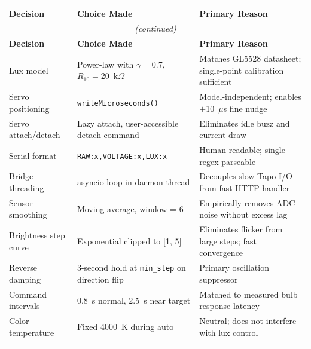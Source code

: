 \documentclass[12pt,letterpaper]{article}
\begin{document}
\begin{longtable}{p{3.5cm}p{5.5cm}p{5cm}}
  \toprule
  \textbf{Decision} & \textbf{Choice Made} & \textbf{Primary Reason} \\
  \midrule
  \endfirsthead
  \multicolumn{3}{c}{\textit{(continued)}} \\
  \toprule
  \textbf{Decision} & \textbf{Choice Made} & \textbf{Primary Reason} \\
  \midrule
  \endhead
  \bottomrule
  \endlastfoot

  Lux model &
    Power-law with $\gamma=0.7$, $R_{10}=20$~k$\Omega$ &
    Matches GL5528 datasheet; single-point calibration sufficient \\
  \addlinespace

  Servo positioning &
    \texttt{writeMicroseconds()} &
    Model-independent; enables $\pm$10~$\mu$s fine nudge \\
  \addlinespace

  Servo attach/detach &
    Lazy attach, user-accessible detach command &
    Eliminates idle buzz and current draw \\
  \addlinespace

  Serial format &
    \texttt{RAW:x,VOLTAGE:x,LUX:x} &
    Human-readable; single-regex parseable \\
  \addlinespace

  Bridge threading &
    asyncio loop in daemon thread &
    Decouples slow Tapo I/O from fast HTTP handler \\
  \addlinespace

  Sensor smoothing &
    Moving average, window = 6 &
    Empirically removes ADC noise without excess lag \\
  \addlinespace

  Brightness step curve &
    Exponential clipped to [1, 5] &
    Eliminates flicker from large steps; fast convergence \\
  \addlinespace

  Reverse damping &
    3-second hold at \texttt{min\_step} on direction flip &
    Primary oscillation suppressor \\
  \addlinespace

  Command intervals &
    0.8~s normal, 2.5~s near target &
    Matched to measured bulb response latency \\
  \addlinespace

  Color temperature &
    Fixed 4000~K during auto &
    Neutral; does not interfere with lux control \\
  \addlinespace


\end{longtable}
\end{document}
